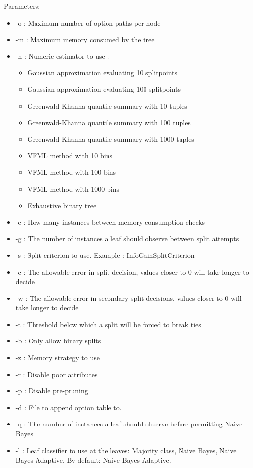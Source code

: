 \documentclass[a4paper,12pt,twoside]{book}
\begin{document}
Parameters:
\begin{itemize}
\item -o : Maximum number of option paths per node
\item -m : Maximum memory consumed by the tree
\item -n : Numeric estimator to use :
\begin{itemize}
\item Gaussian approximation evaluating 10 splitpoints
\item Gaussian approximation evaluating 100 splitpoints
\item Greenwald-Khanna quantile summary with 10 tuples
\item Greenwald-Khanna quantile summary with 100 tuples
\item Greenwald-Khanna quantile summary with 1000 tuples
\item VFML method with 10 bins
\item VFML method with 100 bins
\item VFML method with 1000 bins 
\item Exhaustive binary tree
\end{itemize}
\item -e : How many instances between memory consumption checks
\item -g : The number of instances a leaf should observe between split attempts
\item -s : Split criterion to use. Example : InfoGainSplitCriterion
\item -c : The allowable error in split decision, values closer to 0 will take longer to decide
\item -w : The allowable error in secondary split decisions, values closer to 0 will take longer to decide
\item -t : Threshold below which a split will be forced to break ties
\item -b : Only allow binary splits
\item -z : Memory strategy to use
\item -r : Disable poor attributes
\item -p : Disable pre-pruning
\item -d : File to append option table to.
\item -q : The number of instances a leaf should observe before permitting Naive Bayes
\item -l : Leaf classifier to use at the leaves: Majority class, Naive Bayes, Naive Bayes Adaptive.
By default: Naive Bayes Adaptive.

\end{itemize}
\end{document}
